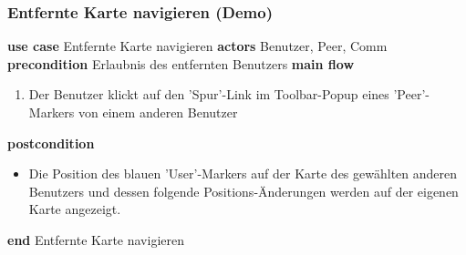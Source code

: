 \subsubsection{Entfernte Karte navigieren (Demo)}\label{subsubsec:uc_remmapnav}
\noindent \textbf{use case} Entfernte Karte navigieren \newline
\indent \textbf{actors} \newline
\indent \indent Benutzer, Peer, Comm \newline
\indent \textbf{precondition} \newline
\indent \indent Erlaubnis des entfernten Benutzers \newline
\indent \textbf{main flow}
\begin{enumerate}[labelwidth=0pt,leftmargin=39pt,noitemsep,topsep=0pt,parsep=0pt,partopsep=0pt]
\item Der Benutzer klickt auf den 'Spur'-Link im Toolbar-Popup eines 'Peer'-Markers von einem anderen Benutzer
\end{enumerate}
\indent \indent \textbf{postcondition}
\begin{itemize}[label={},labelwidth=0pt,leftmargin=24pt,noitemsep,topsep=0pt,parsep=0pt,partopsep=0pt]
\item Die Position des blauen 'User'-Markers auf der Karte des gewählten anderen Benutzers und dessen folgende Positions-Änderungen werden auf der eigenen Karte angezeigt.
\end{itemize}
\noindent \textbf{end} Entfernte Karte navigieren \newline

